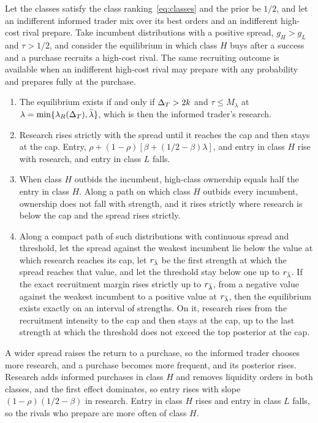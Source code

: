 \begin{proposition}\label{prop:research}
Let the classes satisfy the class ranking~\eqref{eq:classes} and the prior be \(1/2\), and let an indifferent
informed trader mix over its best orders and an indifferent high-cost rival prepare. Take incumbent distributions with
a positive spread, \(g_H>g_L\) and \(\tau>1/2\), and consider the equilibrium in which class \(H\) buys after a
success and a purchase recruits a high-cost rival. The same recruiting outcome is available when an indifferent
high-cost rival may prepare with any probability and prepares fully at the purchase.
\begin{enumerate}[label=(\alph*),leftmargin=2em]
\item The equilibrium exists if and only if \(\Delta_T>2k\) and \(\tau\le M_\lambda\) at
\(\lambda=\min\{\lambda_R(\Delta_T),\bar\lambda\}\), which is then the informed trader's research.
\item Research rises strictly with the spread until it reaches the cap and then stays at the cap. Entry,
\(\rho+(1-\rho)[\beta+(1/2-\beta)\lambda]\), and entry in class \(H\) rise with research, and entry in class \(L\)
falls.
\item When class \(H\) outbids the incumbent, high-class ownership equals half the entry in class \(H\). Along a path
on which class \(H\) outbids every incumbent, ownership does not fall with strength, and it rises strictly where
research is below the cap and the spread rises strictly.
\item Along a compact path of such distributions with continuous spread and threshold, let the spread against the
weakest incumbent lie below the value at which research reaches its cap, let \(r_{\bar\lambda}\) be the first strength at
which the spread reaches that value, and let the threshold stay below one up to \(r_{\bar\lambda}\). If the exact
recruitment margin rises strictly up to \(r_{\bar\lambda}\), from a negative value against the weakest incumbent to a
positive value at \(r_{\bar\lambda}\), then the equilibrium exists exactly on an interval of strengths. On it, research
rises from the recruitment intensity to the cap and then stays at the cap, up to the last strength at which the
threshold does not exceed the top posterior at the cap.
\end{enumerate}
\end{proposition}

A wider spread raises the return to a purchase, so the informed trader chooses more research, and a purchase becomes more
frequent, and its posterior rises. Research adds informed purchases in
class \(H\) and removes liquidity orders in both classes, and the first effect dominates, so entry rises with slope
\((1-\rho)(1/2-\beta)\) in research. Entry in class \(H\) rises and entry in class \(L\) falls, so the rivals who
prepare are more often of class \(H\).

